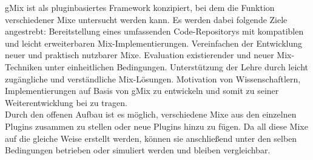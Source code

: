\documentclass[a4paper, 11pt]{article} %
\begin{document}
gMix \cite{FHF12} ist als pluginbasiertes Framework konzipiert, bei dem die Funktion verschiedener Mixe untersucht werden kann. Es werden dabei folgende Ziele angestrebt:
Bereitstellung eines umfassenden Code-Repositorys mit kompatiblen und leicht erweiterbaren Mix-Implementierungen. Vereinfachen der Entwicklung neuer und praktisch nutzbarer Mixe.
Evaluation existierender und neuer Mix-Techniken unter einheitlichen Bedingungen. Unterstützung der Lehre durch leicht zugängliche und verständliche Mix-Lösungen. Motivation von Wissenschaftlern, Implementierungen auf Basis von gMix zu entwickeln und somit zu seiner Weiterentwicklung bei zu tragen.
\\

Durch den offenen Aufbau ist es möglich, verschiedene Mixe aus den einzelnen Plugins zusammen zu stellen oder neue Plugins hinzu zu fügen. Da all diese Mixe auf die gleiche Weise erstellt werden, können sie anschließend unter den selben Bedingungen betrieben oder simuliert werden und bleiben vergleichbar.
\\
\end{document}
